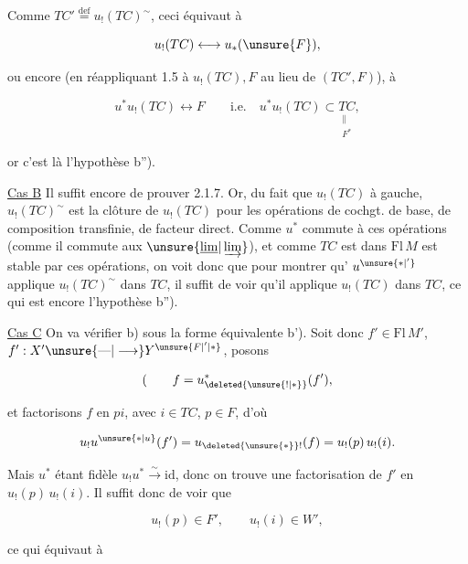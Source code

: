 Comme $TC'\overset{\mathrm{def}}{=}u_!(TC)^{\sim}$, ceci équivaut à

\[
u_!(TC)\longleftrightarrow u_*(\unsure{F}),
\]

ou encore (en réappliquant 1.5 à $u_!(TC),F$
au lieu de $(TC',F)$), à

\[
u^*u_!(TC)\longleftrightarrow F\qquad\text{i.e.}\quad
u^*u_!(TC)\subset\underset{\substack{\parallel\\ F^*}}{TC},
\]

or c'est là l'hypothèse  b'').

\uline{Cas B} Il suffit encore de prouver
2.1.7. Or, du fait que $u_!(TC)$  
  à gauche,
$u_!(TC)^{\sim}$ est la clôture de $u_!(TC)$ pour les
opérations de cochgt. de base, de composition
transfinie, de facteur direct. Comme
$u^*$ commute à  ces opérations (comme
il commute aux  $\unsure{\underline{\lim}|\varinjlim}$), et  comme
$TC$ est dans $\mathrm{Fl}\,M$ est stable par ces opérations,
on voit donc que pour montrer qu'
$u^{\unsure{*|'}}$ applique $u_!(TC)^{\sim}$ dans $TC$, il suffit de
voir qu'il applique $u_!(TC)$ dans $TC$, ce qui
est encore l'hypothèse b'').

\uline{Cas C} On va vérifier b) sous la forme
équivalente b'). Soit donc $f'\in\mathrm{Fl}\,M'$,
 $f':X'\unsure{\text{---}|\longrightarrow}Y^{\unsure{F|'|*}}$,
 posons

\[
(\qquad f=u_{\deleted{\unsure{!|*}}}^{*}(f'),
\]

et factorisons $f$ en $pi$, avec $i\in TC$, $p\in F$,
d'où

\[
u_!u^{\unsure{*|u}}(f')=u_{\deleted{\unsure{*}}!}(f)=u_!(p)\,u_!(i).
\]

Mais $u^*$ étant  fidèle $u_!u^*\xrightarrow{\sim}\mathrm{id}$, donc
on trouve une factorisation de 
$f'$ en $u_!(p)\,u_!(i)$.  Il suffit
donc de voir que

\[
u_!(p)\in F',\qquad u_!(i)\in W',
\]

ce qui équivaut à

